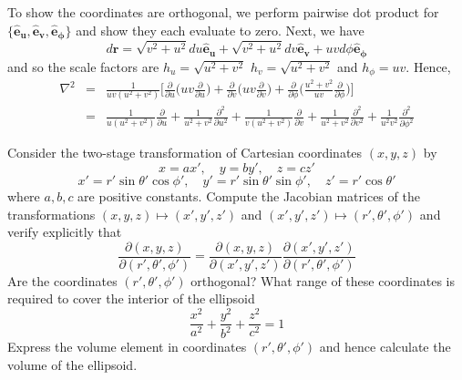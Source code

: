 \documentclass[a4paper]{article}
\begin{document}
\begin{ans}
To show the coordinates are orthogonal, we perform pairwise dot product for $\{\mathbf{\hat{e}_u},\mathbf{\hat{e}_v},\mathbf{\hat{e}_\phi}\}$ and show they each evaluate to zero. Next, we have
$$d\mathbf{r}=\sqrt{v^2+u^2}du\mathbf{\hat{e}_u}+\sqrt{v^2+u^2}dv\mathbf{\hat{e}_v}+uv d\phi\mathbf{\hat{e}_\phi}$$
and so the scale factors are $h_u=\sqrt{u^2+v^2}$ $h_v=\sqrt{u^2+v^2}$ and $h_\phi=uv$. Hence,
\begin{eqnarray}
\nabla^2&=&\frac{1}{uv(u^2+v^2)}\bigg[\frac{\partial}{\partial u}\bigg(uv\frac{\partial}{\partial u}\bigg)+\frac{\partial}{\partial v}\bigg(uv\frac{\partial}{\partial v}\bigg)+\frac{\partial}{\partial\phi}\bigg(\frac{u^2+v^2}{uv}\frac{\partial}{\partial\phi}\bigg)\bigg]\nonumber\\&=&\frac{1}{u(u^2+v^2)}\frac{\partial}{\partial u}+\frac{1}{u^2+v^2}\frac{\partial^2}{\partial u^2}+\frac{1}{v(u^2+v^2)}\frac{\partial}{\partial v}+\frac{1}{u^2+v^2}\frac{\partial^2}{\partial v^2}+\frac{1}{u^2v^2}\frac{\partial^2}{\partial\phi^2}\nonumber
\end{eqnarray}
\end{ans}
\begin{qns}
Consider the two-stage transformation of Cartesian coordinates $(x,y,z)$ by
$$x = ax',\quad y=by',\quad z=cz'$$
$$x'=r'\sin\theta'\cos\phi', \quad y'=r'\sin\theta'\sin\phi',\quad z'=r'\cos\theta'$$
where $a,b,c$ are positive constants. Compute the Jacobian matrices of the transformations $(x,y,z)\mapsto(x',y',z')$ and $(x',y',z')\mapsto (r',\theta',\phi')$ and verify explicitly that
$$\frac{\partial(x,y,z)}{\partial(r',\theta',\phi')}=\frac{\partial(x,y,z)}{\partial(x',y',z')}\frac{\partial(x',y',z')}{\partial(r',\theta',\phi')}$$
Are the coordinates $(r',\theta',\phi')$ orthogonal? What range of these coordinates is required to cover the interior of the ellipsoid
$$\frac{x^2}{a^2}+\frac{y^2}{b^2}+\frac{z^2}{c^2}=1$$
Express the volume element in coordinates $(r',\theta',\phi')$ and hence calculate the volume of the ellipsoid.
\end{qns}
\end{document}
